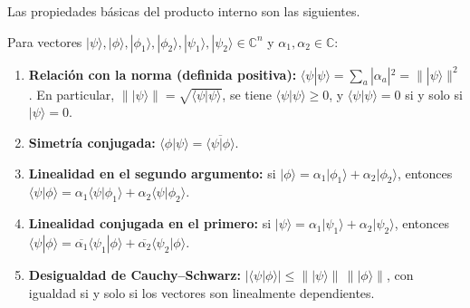 \documentclass[11pt, a4paper, twoside, openright]{report}
\begin{document}
\noindent Las propiedades básicas del producto interno son las siguientes.

\begin{tcolorbox}[colback=teal!5!white,colframe=teal!75!black,title=\textbf{Proposición: Propiedades del producto interno}]
Para vectores $|\psi\rangle, |\phi\rangle, |\phi_1\rangle, |\phi_2\rangle, |\psi_1\rangle, |\psi_2\rangle \in\mathbb{C}^n$ y $\alpha_1,\alpha_2\in\mathbb{C}$:
\begin{enumerate}
    \item \textbf{Relación con la norma (definida positiva):} $\langle\psi|\psi\rangle = \sum_a|\alpha_a|^2 = \||\psi\rangle\|^2$. En particular, $\||\psi\rangle\| = \sqrt{\langle\psi|\psi\rangle}$, se tiene $\langle\psi|\psi\rangle\ge0$, y $\langle\psi|\psi\rangle = 0$ si y solo si $|\psi\rangle = 0$.
    \item \textbf{Simetría conjugada:} $\langle\phi|\psi\rangle = \overline{\langle\psi|\phi\rangle}$.
    \item \textbf{Linealidad en el segundo argumento:} si $|\phi\rangle = \alpha_1|\phi_1\rangle + \alpha_2|\phi_2\rangle$, entonces $\langle\psi|\phi\rangle = \alpha_1\langle\psi|\phi_1\rangle + \alpha_2\langle\psi|\phi_2\rangle$.
    \item \textbf{Linealidad conjugada en el primero:} si $|\psi\rangle = \alpha_1|\psi_1\rangle + \alpha_2|\psi_2\rangle$, entonces $\langle\psi|\phi\rangle = \overline{\alpha_1}\langle\psi_1|\phi\rangle + \overline{\alpha_2}\langle\psi_2|\phi\rangle$.
    \item \textbf{Desigualdad de Cauchy--Schwarz:} $|\langle\psi|\phi\rangle| \le \||\psi\rangle\|\,\||\phi\rangle\|$, con igualdad si y solo si los vectores son linealmente dependientes.
\end{enumerate}
\end{tcolorbox}
\end{document}
